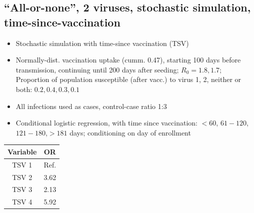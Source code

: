 \documentclass{beamer}
\begin{document}
\subsection{``All-or-none'', 2 viruses, stochastic simulation, time-since-vaccination}
\begin{itemize}
	\item Stochastic simulation with time-since vaccination (TSV)
	\item Normally-dist. vaccination uptake (cumm. 0.47), starting 100 days before transmission, continuing until 200 days after seeding; $R_0=1.8,1.7$; Proportion of population susceptible (after vacc.) to virus 1, 2, neither or both: $0.2,0.4,0.3,0.1$
	\item All infections used as cases, control-case ratio 1:3
	\item Conditional logistic regression, with time since vaccination: $< 60$, $61-120$,$121-180$,$>181$ days; conditioning on day of enrollment
	
\end{itemize}
\centering
\begin{tabular}{cc}
Variable & OR\\
\hline
TSV 1 & Ref.\\
TSV 2 & 3.62\\
TSV 3 & 2.13 \\
TSV 4 & 5.92 \\
\hline
\end{tabular}
\end{document}
